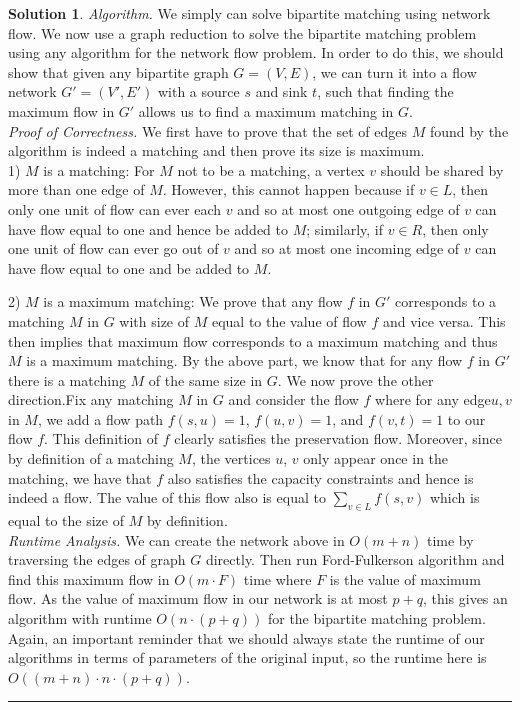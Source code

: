 \documentclass{article}
\theoremstyle{definition}
\def\fline{\rule{0.75\linewidth}{0.5pt}}
\newcommand{\finishline}{\begin{center}\fline\end{center}}
\newtheorem*{solution*}{Solution}
\newenvironment{solution}{\begin{solution*}}{{\finishline} \end{solution*}}
\begin{document}
\begin{solution}
 
	\emph{Algorithm.} We simply can solve bipartite matching using network flow. We now use a graph reduction to solve the bipartite matching problem using any algorithm for the network flow problem.  In order to do this, we should show that given any bipartite graph $G= (V, E)$, we can turn it into a flow network $G'= (V', E')$ with a source $s$ and sink $t$, such that finding the maximum flow in $G'$ allows us to find a maximum matching in $G$. \\
	
	\emph{Proof of Correctness.} We first have to prove that the set of edges $M$ found by the algorithm is indeed a matching and then prove its size is maximum. \\
	
	1) $M$ is a matching: For $M$ not to be a matching, a vertex $v$ should be shared by more than one edge of $M$.  However, this cannot happen because if $v\in L$, then only one unit of flow can ever each $v$ and so at most one outgoing edge of $v$ can have flow equal to one and hence be added to $M$; similarly, if $v \in R$, then only one unit of flow can ever go out of $v$ and so at most one incoming edge of $v$ can have flow equal to one and be added to $M$. 
	
	2) $M$ is a maximum matching: We prove that any flow $f$ in $G'$ corresponds to a matching $M$ in $G$ with size of $M$ equal to the value of flow $f$ and vice versa.  This then implies that maximum flow corresponds to a maximum matching and thus $M$ is a maximum matching.  By the above part, we know that for any flow $f$ in $G'$ there is a matching $M$ of the same size in $G$.  We now prove the other direction.Fix  any  matching $M$ in $G$ and  consider  the  flow $f$ where  for  any  edge${u, v}$ in $M$,  we  add  a flow path $f(s, u) = 1$, $f(u, v) = 1$, and $f(v, t) = 1$ to our flow $f$.  This definition of $f$ clearly satisfies the preservation flow.  Moreover, since by definition of a matching $M$, the vertices $u$, $v$ only appear once in the matching, we have that $f$ also satisfies the capacity constraints and hence is indeed a flow.  The value of this flow also is equal to $\sum_{v \in L} f(s, v)$ which is equal to the size of $M$ by definition. \\
	
	\emph{Runtime Analysis.} We can create the network above in $O(m+n)$ time by traversing the edges of graph $G$ directly. Then run Ford-Fulkerson algorithm and find this maximum flow in $O(m \cdot F)$ time where $F$ is the value of maximum flow.  As the value of maximum flow in our network is at most $p+q$, this gives an algorithm with runtime $O(n \cdot (p+q))$ for the bipartite matching problem. Again, an important reminder that we should always state the runtime of our algorithms in terms of parameters of the original input, so the runtime here is $O((m+n) \cdot n \cdot (p+q))$. \\

\end{solution}
\end{document}
